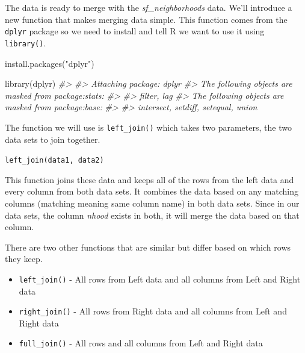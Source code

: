 \documentclass[
]{krantz}
\makeatletter
\newenvironment{Shaded}{\begin{snugshade}}{\end{snugshade}}
\newcommand{\CommentTok}[1]{\textcolor[rgb]{0.37,0.37,0.37}{\textit{#1}}}
\newcommand{\FunctionTok}[1]{\textcolor[rgb]{0,0,0}{#1}}
\newcommand{\NormalTok}[1]{#1}
\newcommand{\StringTok}[1]{\textcolor[rgb]{0.5,0.5,0.5}{#1}}
\providecommand{\tightlist}{%
  \setlength{\itemsep}{0pt}\setlength{\parskip}{0pt}}
\newenvironment{kframe}{%
\medskip{}
\setlength{\fboxsep}{.8em}
 \def\at@end@of@kframe{}%
 \ifinner\ifhmode%
  \def\at@end@of@kframe{\end{minipage}}%
  \begin{minipage}{\columnwidth}%
 \fi\fi%
 \def\FrameCommand##1{\hskip\@totalleftmargin \hskip-\fboxsep
 \colorbox{shadecolor}{##1}\hskip-\fboxsep
     \hskip-\linewidth \hskip-\@totalleftmargin \hskip\columnwidth}%
 \MakeFramed {\advance\hsize-\width
   \@totalleftmargin\z@ \linewidth\hsize
   \@setminipage}}%
 {\par\unskip\endMakeFramed%
 \at@end@of@kframe}
\renewenvironment{Shaded}{\begin{kframe}}{\end{kframe}}
\makeatother
\begin{document}
The data is ready to merge with the \emph{sf\_neighborhoods} data. We'll introduce a new function that makes merging data simple. This function comes from the \texttt{dplyr} package so we need to install and tell R we want to use it using \texttt{library()}.

\begin{Shaded}
\begin{Highlighting}[]
\FunctionTok{install.packages}\NormalTok{(}\StringTok{"dplyr"}\NormalTok{)}
\end{Highlighting}
\end{Shaded}

\begin{Shaded}
\begin{Highlighting}[]
\FunctionTok{library}\NormalTok{(dplyr)}
\CommentTok{\#\textgreater{} }
\CommentTok{\#\textgreater{} Attaching package: \textquotesingle{}dplyr\textquotesingle{}}
\CommentTok{\#\textgreater{} The following objects are masked from \textquotesingle{}package:stats\textquotesingle{}:}
\CommentTok{\#\textgreater{} }
\CommentTok{\#\textgreater{}     filter, lag}
\CommentTok{\#\textgreater{} The following objects are masked from \textquotesingle{}package:base\textquotesingle{}:}
\CommentTok{\#\textgreater{} }
\CommentTok{\#\textgreater{}     intersect, setdiff, setequal, union}
\end{Highlighting}
\end{Shaded}

The function we will use is \texttt{left\_join()} which takes two parameters, the two data sets to join together.

\texttt{left\_join(data1,\ data2)}

This function joins these data and keeps all of the rows from the left data and every column from both data sets. It combines the data based on any matching columns (matching meaning same column name) in both data sets. Since in our data sets, the column \emph{nhood} exists in both, it will merge the data based on that column.

There are two other functions that are similar but differ based on which rows they keep.

\begin{itemize}
\tightlist
\item
  \texttt{left\_join()} - All rows from Left data and all columns from Left and Right data
\item
  \texttt{right\_join()} - All rows from Right data and all columns from Left and Right data
\item
  \texttt{full\_join()} - All rows and all columns from Left and Right data
\end{itemize}
\end{document}
